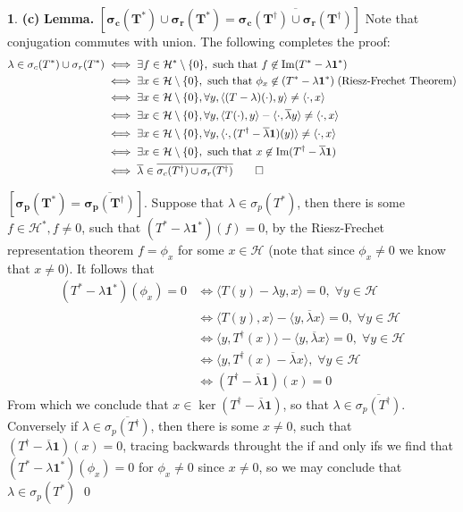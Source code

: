 \documentclass[11pt]{article}
\theoremstyle{definition}
\newtheorem{pb}{}
\newcommand{\set}[1]{\{#1\}}
\newcommand{\im}{\text{Im}}
\newcommand{\gen}[1]{\langle #1 \rangle}
\begin{document}
\begin{pb}
        \textbf{(c)} \textbf{Lemma.} \(\mathbf{[\sigma_c(T^*) \cup \sigma_r(T^*) = \overline{\sigma_c(T^\dagger) \cup \sigma_r(T^\dagger)}]}\) Note that conjugation commutes with union. The following completes the proof:
        \begin{align*}
            \lambda \in \sigma_c(T^*) \cup \sigma_r(T^*) &\iff \exists f \in \mathcal{H}^*\setminus\set{0}, \text{ such that } f \not \in \im(T^* - \lambda\mathbf{1}^*) \\
            &\iff \exists x \in \mathcal{H}\setminus\set{0}, \text{ such that } \phi_x \not \in (T^* - \lambda\mathbf{1}^*)\; (\text{Riesz-Frechet Theorem})\\
            &\iff \exists x \in \mathcal{H}\setminus\set{0}, \forall y, \gen{(T - \lambda)(\cdot),y} \neq \gen{\cdot,x} \\
            &\iff \exists x \in \mathcal{H}\setminus\set{0}, \forall y, \gen{T(\cdot),y} - \gen{\cdot,\overline{\lambda}y}  \neq \gen{\cdot,x} \\
            &\iff \exists x \in \mathcal{H}\setminus\set{0}, \forall y, \gen{\cdot,(T^\dagger - \overline{\lambda}\mathbf{1})(y)} \neq \gen{\cdot,x} \\
            &\iff \exists x \in \mathcal{H}\setminus\set{0}, \text{ such that } x \not \in \im(T^\dagger - \overline{\lambda}\mathbf{1}) \\
            &\iff \overline{\lambda} \in \overline{\sigma_c(T^\dagger) \cup \sigma_r(T^\dagger)} \qed
        \end{align*}
        
        \(\mathbf{[\sigma_p(T^*) = \overline{\sigma_p(T^\dagger)}]}.\) Suppose that \(\lambda \in \sigma_p(T^*)\), then there is some \(f \in \mathcal{H}^*, f\neq 0\), such that \((T^* - \lambda\mathbf{1}^*)(f) = 0\), by the Riesz-Frechet representation theorem \(f = \phi_x\) for some \(x \in \mathcal{H}\) (note that since \(\phi_x \neq 0\) we know that \(x \neq 0\)).
        It follows that
        \begin{align*}
            (T^* - \lambda\mathbf{1}^*)(\phi_x) = 0 &\iff \gen{T(y)- \lambda y,x} = 0, \; \forall y \in \mathcal{H} \\
            &\iff \gen{T(y),x} - \gen{y,\overline{\lambda}x} = 0,\; \forall y\in \mathcal{H} \\
            &\iff \gen{y,T^\dagger(x)} - \gen{y,\overline{\lambda}x} = 0,\; \forall y\in \mathcal{H} \\
            &\iff \gen{y,T^\dagger(x) - \overline{\lambda}x},\; \forall y\in \mathcal{H} \\
            &\iff (T^\dagger - \overline{\lambda}\mathbf{1})(x) = 0
        \end{align*}
        From which we conclude that \(x \in \ker(T^\dagger - \overline{\lambda}\mathbf{1})\), so that \(\lambda \in \overline{\sigma_p(T^\dagger)}\). Conversely if \(\lambda \in \overline{\sigma_p(T^\dagger)}\), then there is some \(x \neq 0\), such that \((T^\dagger - \overline{\lambda}\mathbf{1})(x) = 0\), tracing backwards throught the if and only ifs we find that \((T^* - \lambda\mathbf{1}^*)(\phi_x) = 0\) for \(\phi_x \neq 0\) since \(x \neq 0\), so we may conclude that \(\lambda \in \sigma_p(T^*)\) \qed


\end{pb}
\end{document}
